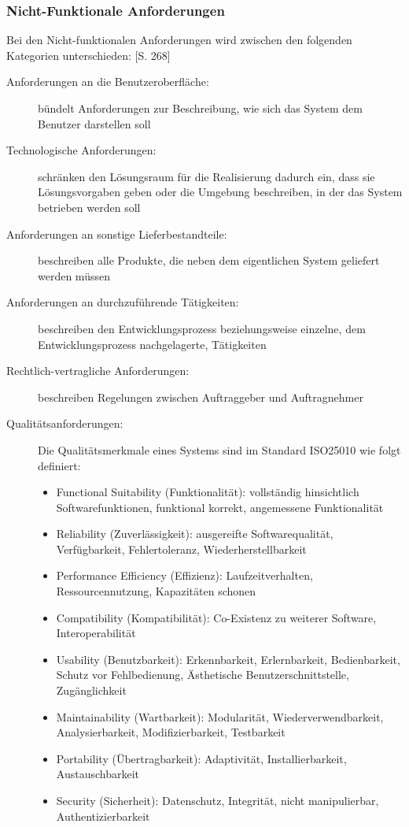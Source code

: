 \subsubsection{Nicht-Funktionale Anforderungen}
Bei den Nicht-funktionalen Anforderungen wird zwischen den folgenden Kategorien unterschieden: \cite{rupp}[S. 268]
\begin{description}
\item[Anforderungen an die Benutzeroberfläche:] bündelt Anforderungen zur Beschreibung,
wie sich das System dem Benutzer darstellen soll
\item[Technologische Anforderungen:] schränken den Lösungsraum für die Realisierung dadurch
ein, dass sie Lösungsvorgaben geben oder die Umgebung beschreiben, in der das System betrieben werden soll
\item[Anforderungen an sonstige Lieferbestandteile:] beschreiben alle Produkte, die neben
dem eigentlichen System geliefert werden müssen
\item[Anforderungen an durchzuführende Tätigkeiten:] beschreiben den Entwicklungsprozess
beziehungsweise einzelne, dem Entwicklungsprozess nachgelagerte, Tätigkeiten
\item[Rechtlich-vertragliche Anforderungen:] beschreiben Regelungen zwischen Auftraggeber
und Auftragnehmer
\item[Qualitätsanforderungen:]
Die Qualitätsmerkmale eines Systems sind im Standard ISO25010 \cite{ISO25010} wie folgt definiert:
\begin{itemize}
\item{Functional Suitability (Funktionalität):}
vollständig hinsichtlich Softwarefunktionen, funktional korrekt, angemessene Funktionalität
\item{Reliability (Zuverlässigkeit):}
ausgereifte Softwarequalität, Verfügbarkeit, Fehlertoleranz, Wiederherstellbarkeit
\item{Performance Efficiency (Effizienz):}
Laufzeitverhalten, Ressourcennutzung, Kapazitäten schonen
\item{Compatibility (Kompatibilität):}
Co-Existenz zu weiterer Software, Interoperabilität
\item{Usability (Benutzbarkeit):}
Erkennbarkeit, Erlernbarkeit, Bedienbarkeit, Schutz vor Fehlbedienung, Ästhetische Benutzerschnittstelle, Zugänglichkeit
\item{Maintainability (Wartbarkeit):}
Modularität, Wiederverwendbarkeit, Analysierbarkeit, Modifizierbarkeit, Testbarkeit
\item{Portability (Übertragbarkeit):}
Adaptivität, Installierbarkeit, Austauschbarkeit
\item{Security (Sicherheit):}
Datenschutz, Integrität, nicht manipulierbar, Authentizierbarkeit
\end{itemize}
\end{description}

